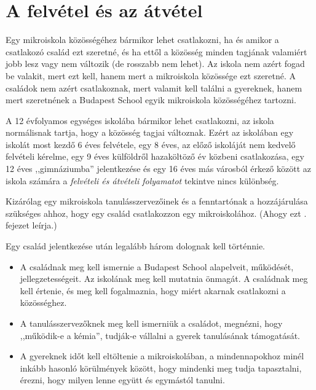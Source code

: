 \section{A felvétel és az átvétel}
\label{sec:felvetel-atvetel}
Egy mikroiskola közösségéhez bármikor lehet csatlakozni, ha és amikor a
csatlakozó
család ezt szeretné, és ha ettől a közösség minden tagjának valamiért  jobb
lesz vagy nem változik (de rosszabb nem lehet).
Az iskola nem azért fogad be valakit, mert
ezt kell, hanem mert a mikroiskola közössége ezt szeretné.
A családok nem azért csatlakoznak, mert valamit kell találni a gyereknek, hanem
mert
szeretnének a Budapest School egyik mikroiskola közösségéhez tartozni.

A 12 évfolyamos egységes iskolába bármikor lehet csatlakozni, az iskola
normálisnak tartja, hogy a közösség tagjai változnak.
Ezért az iskolában egy iskolát most kezdő 6 éves felvétele, egy 8 éves, az előző
iskoláját nem kedvelő felvételi kérelme, egy 9 éves
külföldről hazaköltöző év közbeni csatlakozása, egy 12 éves ,,gimnáziumba''
jelentkezése és egy 16 éves más városból érkező  között az iskola
számára
a \emph{felvételi és átvételi folyamatot} tekintve nincs különbség.

Kizárólag egy mikroiskola tanulásszervezőinek és a fenntartónak
a\linebreak
hozzájárulása
szükséges ahhoz, hogy
egy család csatlakozzon egy mikroiskolához. (Ahogy ezt
. fejezet leírja.)

Egy család jelentkezése után legalább három dolognak kell történnie.
\begin{itemize}
      \item A családnak meg kell ismernie a Budapest School alapelveit,
            működését, jellegzetességeit. Az iskolának meg kell mutatnia
            önmagát. A
            családnak meg kell értenie,  és meg kell fogalmaznia, hogy miért
            akarnak
            csatlakozni a közösséghez.
      \item A tanulásszervezőknek meg kell ismerniük a családot, megnézni, hogy
            ,,működik-e a kémia'', tudják-e vállalni a gyerek tanulásának
            támogatását.
      \item A gyereknek időt kell eltöltenie a mikroiskolában, a mindennapokhoz
            minél inkább hasonló körülmények között, hogy mindenki meg tudja
            tapasztalni,
            érezni, hogy milyen lenne együtt és egymástól tanulni.
\end{itemize}

